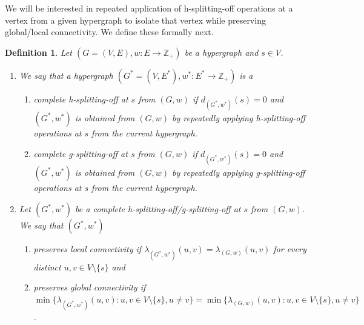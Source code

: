 \documentclass{article}
\newtheorem{definition}{Definition}[section]
\providecommand{\Z}{\mathbb{Z}}
\begin{document}
We will be interested in repeated application of h-splitting-off operations at a vertex from a given hypergraph to isolate that vertex while preserving global/local connectivity. We define these formally next. 
\begin{definition}
    Let $(G=(V, E), w: E\rightarrow \Z_+)$ be a hypergraph and $s\in V$. 
    \begin{enumerate}
        \item We say that a hypergraph $(G^*=(V, E^*), w^*: E^*\rightarrow \Z_+)$ is a 
        \begin{enumerate}
            \item \emph{complete h-splitting-off at $s$ from $(G, w)$} if $d_{(G^*, w^*)}(s) = 0$ and $(G^*, w^*)$ is obtained from $(G, w)$ by repeatedly applying h-splitting-off operations at $s$ from the current hypergraph. 
            \item \emph{complete g-splitting-off at $s$ from $(G, w)$} if $d_{(G^*, w^*)}(s) = 0$ and $(G^*, w^*)$ is obtained from $(G, w)$ by repeatedly applying g-splitting-off operations at $s$ from the current hypergraph. 
        \end{enumerate}

        \item Let $(G^*, w^*)$ be a complete h-splitting-off/g-splitting-off at $s$ from $(G, w)$. We say that $(G^*, w^*)$ 
        \begin{enumerate}
            \item 
            preserves local connectivity if $\lambda_{(G^*, w^*)}(u, v)=\lambda_{(G, w)}(u, v)$ for every distinct $u, v\in V\setminus\{s\}$ and 
            
            \item preserves global connectivity if \\
            $\min\{\lambda_{(G^*, w^*)}(u, v): u, v\in V\setminus \{s\}, u \neq v\}=\min\{\lambda_{(G, w)}(u, v): u, v\in V\setminus \{s\}, u \neq v\}$. 
            
        \end{enumerate}
    \end{enumerate}
\end{definition}
\end{document}
